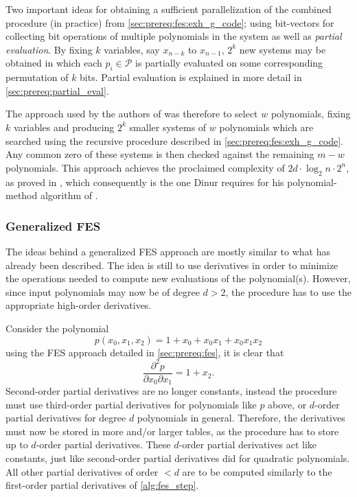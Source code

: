 Two important ideas for obtaining a sufficient parallelization of the combined procedure (in practice) from \cref{sec:prereq:fes:exh_g_code}; using bit-vectors for collecting bit operations of multiple polynomials in the system as well as \textit{partial evaluation}. By fixing $k$ variables, say $x_{n-k}$ to $x_{n-1}$, $2^k$ new systems may be obtained in which each $p_i \in \mathcal{P}$ is partially evaluated on some corresponding permutation of $k$ bits. Partial evaluation is explained in more detail in \cref{sec:prereq:partial_eval}.

The approach used by the authors of \cite{ches-2010-23990, cryptoeprint:2013/436} was therefore to select $w$ polynomials, fixing $k$ variables and producing $2^k$ smaller systems of $w$ polynomials which are searched using the recursive procedure described in \cref{sec:prereq:fes:exh_g_code}. Any common zero of these systems is then checked against the remaining $m-w$ polynomials. This approach achieves the proclaimed complexity of $2d\cdot\log_2 n \cdot 2^n$, as proved in \cite{ches-2010-23990}, which consequently is the one Dinur requires for his polynomial-method algorithm of \cite{eurocrypt-2021-30841}.

\subsubsection{Generalized FES} \label{sec:ext:fes_interp:g_fes}
The ideas behind a generalized FES approach are mostly similar to what has already been described. The idea is still to use derivatives in order to minimize the operations needed to compute new evaluations of the polynomial(s). However, since input polynomials may now be of degree $d > 2$, the procedure has to use the appropriate high-order derivatives.

Consider the polynomial
$$
    p(x_0, x_1, x_2) = 1 + x_0 + x_0 x_1 + x_0 x_1 x_2
$$
using the FES approach detailed in \cref{sec:prereq:fes}, it is clear that 
$$
    \frac{\partial^2 p}{\partial x_0 \partial x_1} = 1 + x_2.
$$
Second-order partial derivatives are no longer constants, instead the procedure must use third-order partial derivatives for polynomials like $p$ above, or $d$-order partial derivatives for degree $d$ polynomials in general. Therefore, the derivatives must now be stored in more and/or larger tables, as the procedure has to store up to $d$-order partial derivatives. These $d$-order partial derivatives act like constants, just like second-order partial derivatives did for quadratic polynomials. All other partial derivatives of order $< d$ are to be computed similarly to the first-order partial derivatives of \cref{alg:fes_step}. 

